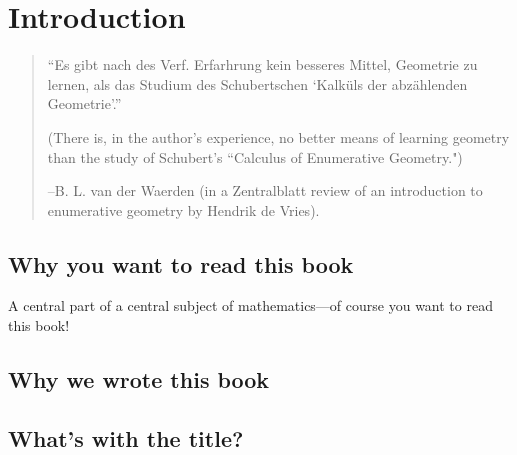 

\setlength{\parskip}{5pt}

\addtocounter{chapter}{-1}
\chapter{Introduction}
\label{IntroChapter}

\begin{quote}
\small\sf
``Es gibt nach des Verf. Erfarhrung kein besseres Mittel, Geometrie zu lernen, als
das Studium des Schubertschen `Kalk\"uls der abz\"ahlenden Geometrie'.''

(There is, in the author's experience, no better means of learning geometry than
the study of Schubert's ``Calculus of Enumerative Geometry.")

--B. L. van der Waerden (in a Zentralblatt review of an introduction to enumerative geometry
by Hendrik de Vries).
\bigskip

\end{quote}

%


\section{Why you want to read this book}


A central part of a central subject of mathematics---of course you want to read this book! 

\section{Why we wrote this book}


\section{What's with the title?}




